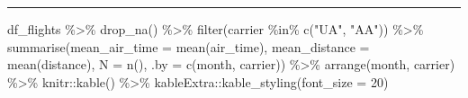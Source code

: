 \documentclass[
  letterpaper,
  DIV=11]{scrartcl}
\newenvironment{Shaded}{\begin{snugshade}}{\end{snugshade}}
\newcommand{\AttributeTok}[1]{\textcolor[rgb]{0.40,0.45,0.13}{#1}}
\newcommand{\DecValTok}[1]{\textcolor[rgb]{0.68,0.00,0.00}{#1}}
\newcommand{\FunctionTok}[1]{\textcolor[rgb]{0.28,0.35,0.67}{#1}}
\newcommand{\NormalTok}[1]{\textcolor[rgb]{0.00,0.23,0.31}{#1}}
\newcommand{\SpecialCharTok}[1]{\textcolor[rgb]{0.37,0.37,0.37}{#1}}
\newcommand{\StringTok}[1]{\textcolor[rgb]{0.13,0.47,0.30}{#1}}
\begin{document}
\begin{center}\rule{0.5\linewidth}{0.5pt}\end{center}

\begin{Shaded}
\begin{Highlighting}[numbers=left,,]
\NormalTok{df\_flights }\SpecialCharTok{\%\textgreater{}\%} 
  \FunctionTok{drop\_na}\NormalTok{() }\SpecialCharTok{\%\textgreater{}\%}
  \FunctionTok{filter}\NormalTok{(carrier }\SpecialCharTok{\%in\%} \FunctionTok{c}\NormalTok{(}\StringTok{"UA"}\NormalTok{, }\StringTok{"AA"}\NormalTok{)) }\SpecialCharTok{\%\textgreater{}\%} 
  \FunctionTok{summarise}\NormalTok{(}\AttributeTok{mean\_air\_time =} \FunctionTok{mean}\NormalTok{(air\_time),}
            \AttributeTok{mean\_distance =} \FunctionTok{mean}\NormalTok{(distance),}
            \AttributeTok{N =} \FunctionTok{n}\NormalTok{(),}
            \AttributeTok{.by =} \FunctionTok{c}\NormalTok{(month, carrier)) }\SpecialCharTok{\%\textgreater{}\%} 
  \FunctionTok{arrange}\NormalTok{(month, carrier) }\SpecialCharTok{\%\textgreater{}\%} 
\NormalTok{  knitr}\SpecialCharTok{::}\FunctionTok{kable}\NormalTok{() }\SpecialCharTok{\%\textgreater{}\%} 
\NormalTok{  kableExtra}\SpecialCharTok{::}\FunctionTok{kable\_styling}\NormalTok{(}\AttributeTok{font\_size =} \DecValTok{20}\NormalTok{)}
\end{Highlighting}
\end{Shaded}
\end{document}

